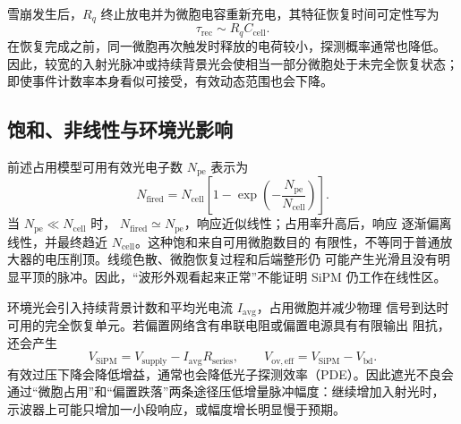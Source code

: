 \documentclass[UTF8,10pt,letterpaper,fontset=none]{ctexart}
\begin{document}
雪崩发生后，$R_q$ 终止放电并为微胞电容重新充电，其特征恢复时间可定性写为
\begin{equation}
  \tau_{\mathrm{rec}} \sim R_q C_{\mathrm{cell}} .
  \label{eq:sipm-recovery-time}
\end{equation}
在恢复完成之前，同一微胞再次触发时释放的电荷较小，探测概率通常也降低。
因此，较宽的入射光脉冲或持续背景光会使相当一部分微胞处于未完全恢复状态；
即使事件计数率本身看似可接受，有效动态范围也会下降。

\subsection{饱和、非线性与环境光影响}

前述占用模型可用有效光电子数 $N_{\mathrm{pe}}$ 表示为
\begin{equation}
  N_{\mathrm{fired}}
    = N_{\mathrm{cell}}\left[
      1-\exp\left(-\frac{N_{\mathrm{pe}}}{N_{\mathrm{cell}}}\right)
      \right].
  \label{eq:sipm-occupancy-npe}
\end{equation}
当 $N_{\mathrm{pe}}\ll N_{\mathrm{cell}}$ 时，
$N_{\mathrm{fired}}\simeq N_{\mathrm{pe}}$，响应近似线性；占用率升高后，响应
逐渐偏离线性，并最终趋近 $N_{\mathrm{cell}}$。这种饱和来自可用微胞数目的
有限性，不等同于普通放大器的电压削顶。线缆色散、微胞恢复过程和后端整形仍
可能产生光滑且没有明显平顶的脉冲。因此，“波形外观看起来正常”不能证明
SiPM 仍工作在线性区。

环境光会引入持续背景计数和平均光电流 $I_{\mathrm{avg}}$，占用微胞并减少物理
信号到达时可用的完全恢复单元。若偏置网络含有串联电阻或偏置电源具有有限输出
阻抗，还会产生
\begin{equation}
  V_{\mathrm{SiPM}} = V_{\mathrm{supply}} - I_{\mathrm{avg}}R_{\mathrm{series}},
  \qquad
  V_{\mathrm{ov,eff}} = V_{\mathrm{SiPM}}-V_{\mathrm{bd}} .
  \label{eq:sipm-background-bias-drop}
\end{equation}
有效过压下降会降低增益，通常也会降低光子探测效率（PDE）。因此遮光不良会
通过“微胞占用”和“偏置跌落”两条途径压低增量脉冲幅度：继续增加入射光时，
示波器上可能只增加一小段响应，或幅度增长明显慢于预期。
\end{document}
